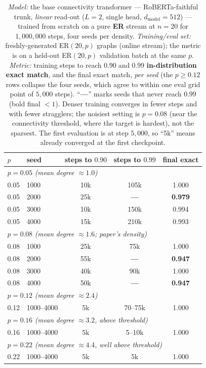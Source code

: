 \documentclass[11pt,a4paper]{article}
\begin{document}
\begin{table}[H]\centering\small
\begin{tabular}{llccc}
\toprule
$p$ & seed & steps to $0.90$ & steps to $0.99$ & final exact \\
\midrule
\multicolumn{5}{l}{\emph{$p=0.05$ (mean degree $\approx1.0$)}} \\
0.05 & 1000 & 10k & 105k & 1.000 \\
0.05 & 2000 & 25k & \textbf{---} & \textbf{0.979} \\
0.05 & 3000 & 10k & 150k & 0.994 \\
0.05 & 4000 & 15k & 210k & 0.993 \\
\multicolumn{5}{l}{\emph{$p=0.08$ (mean degree $\approx1.6$; paper's density)}} \\
0.08 & 1000 & 25k & 75k & 1.000 \\
0.08 & 2000 & 55k & \textbf{---} & \textbf{0.947} \\
0.08 & 3000 & 40k & 90k & 1.000 \\
0.08 & 4000 & 50k & \textbf{---} & \textbf{0.947} \\
\multicolumn{5}{l}{\emph{$p=0.12$ (mean degree $\approx2.4$)}} \\
0.12 & 1000--4000 & 5k & 70--75k & 1.000 \\
\multicolumn{5}{l}{\emph{$p=0.16$ (mean degree $\approx3.2$, above threshold)}} \\
0.16 & 1000--4000 & 5k & 5--10k & 1.000 \\
\multicolumn{5}{l}{\emph{$p=0.22$ (mean degree $\approx4.4$, well above threshold)}} \\
0.22 & 1000--4000 & 5k & 5k & 1.000 \\
\bottomrule
\end{tabular}
\caption{\emph{Model:} the base connectivity transformer --- RoBERTa-faithful trunk, \emph{linear}
read-out ($L=2$, single head, $d_{\mathrm{model}}=512$) --- trained from scratch on a pure
\textbf{ER} stream at $n=20$ for $1{,}000{,}000$ steps, four seeds per density.
\emph{Training/eval set:} freshly-generated ER$(20,p)$ graphs (online stream); the metric is on a
held-out ER$(20,p)$ validation batch at the same $p$. \emph{Metric:} training steps to reach
$0.90$ and $0.99$ \textbf{in-distribution exact match}, and the final exact match, \emph{per seed}
(the $p\ge0.12$ rows collapse the four seeds, which agree to within one eval grid point of
$5{,}000$ steps). ``\textbf{---}'' marks seeds that never reach $0.99$ (bold final $<1$). Denser
training converges in fewer steps and with fewer stragglers; the noisiest setting is $p=0.08$
(near the connectivity threshold, where the target is hardest), not the sparsest. The first
evaluation is at step $5{,}000$, so ``5k'' means already converged at the first checkpoint.}
\label{tab:dens_conv}
\end{table}
\end{document}

